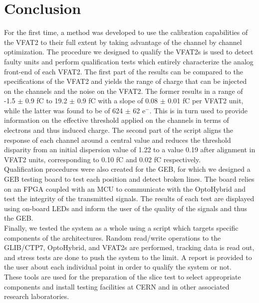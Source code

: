   \section{Conclusion}

    For the first time, a method was developed to use the calibration capabilities of the VFAT2 to their full extent by taking advantage of the channel by channel optimization. The procedure we designed to qualify the VFAT2s is used to detect faulty units and perform qualification tests which entirely characterize the analog front-end of each VFAT2. The first part of the results can be compared to the specifications of the VFAT2 and yields the range of charge that can be injected on the channels and the noise on the VFAT2. The former results in a range of -1.5 $\pm$ 0.9 fC to 19.2 $\pm$ 0.9 fC with a slope of 0.08 $\pm$ 0.01 fC per VFAT2 unit, while the latter was found to be of 624 $\pm$ 62 e$^-$. This is in turn used to provide information on the effective threshold applied on the channels in terms of electrons and thus induced charge. The second part of the script aligns the response of each channel around a central value and reduces the threshold disparity from an initial dispersion value of 1.22 to a value 0.19 after alignment in VFAT2 units, corresponding to 0.10 fC and 0.02 fC respectively. \\

    Qualification procedures were also created for the GEB, for which we designed a GEB testing board to test each position and detect broken lines. The board relies on an FPGA coupled with an MCU to communicate with the OptoHybrid and test the integrity of the transmitted signals. The results of each test are displayed using on-board LEDs and inform the user of the quality of the signals and thus the GEB. \\

    Finally, we tested the system as a whole using a script which targets specific components of the architectures. Random read/write operations to the GLIB/CTP7, OptoHybrid, and VFAT2s are performed, tracking data is read out, and stress tests are done to push the system to the limit. A report is provided to the user about each individual point in order to qualify the system or not. \\

    These tools are used for the preparation of the slice test to select appropriate components and install testing facilities at CERN and in other associated research laboratories.

